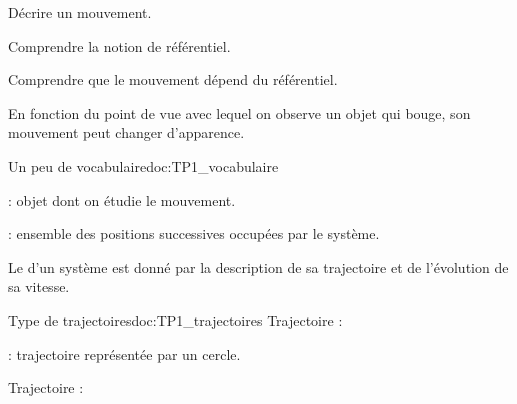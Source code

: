 \teteSndMouv

\nomPrenomClasse
{}

\begin{objectifs}
  \item Décrire un mouvement.
  \item Comprendre la notion de référentiel.
  \item Comprendre que le mouvement dépend du référentiel.
\end{objectifs}

\begin{contexte}
  En fonction du point de vue avec lequel on observe un objet qui bouge, son mouvement peut changer d'apparence.

\end{contexte}



\begin{doc}{Un peu de vocabulaire}{doc:TP1_vocabulaire}
  \begin{importants}
     : objet dont on étudie le mouvement.
  \end{importants}
  
  \begin{importants}
     : ensemble des positions successives occupées par le système.
  \end{importants}
  
  Le  d'un système est donné par la description de sa trajectoire et de l'évolution de sa vitesse.
\end{doc} 


\begin{doc}{Type de trajectoires}{doc:TP1_trajectoires}
  Trajectoire  : 
  
   : trajectoire représentée par un cercle.
  
  Trajectoire  : 
\end{doc}


